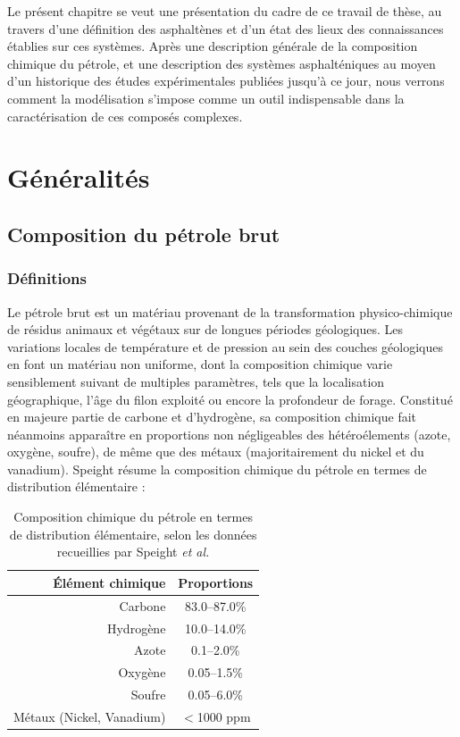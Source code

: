 Le présent chapitre se veut une présentation du cadre de ce travail de thèse, au travers d'une définition des asphaltènes et d'un état des lieux des connaissances établies sur ces systèmes. Après une description générale de la composition chimique du pétrole, et une description des systèmes asphalténiques au moyen d'un historique des études expérimentales publiées jusqu'à ce jour, nous verrons comment la modélisation s'impose comme un outil indispensable dans la caractérisation de ces composés complexes. 




\section{Généralités}

\subsection{Composition du pétrole brut}

\subsubsection{Définitions}

Le pétrole brut est un matériau provenant de la transformation physico-chimique de résidus animaux et végétaux sur de longues périodes géologiques. Les variations locales de température et de pression au sein des couches géologiques en font un matériau non uniforme, dont la composition chimique varie sensiblement suivant de multiples paramètres, tels que la localisation géographique, l'âge du filon exploité ou encore la profondeur de forage. Constitué en majeure partie de carbone et d'hydrogène, sa composition chimique fait néanmoins apparaître en proportions non négligeables des hétéroélements (azote, oxygène, soufre), de même que des métaux (majoritairement du nickel et du vanadium). Speight \cite{speight1979some} résume la composition chimique du pétrole en termes de distribution élémentaire : 

\begin{table}[h!]
	\begin{center}
		\begin{tabular}{r|c}
			\hline
			Élément chimique & Proportions \\
			\hline
			Carbone & 83.0--87.0\% \\
			Hydrogène & 10.0--14.0\% \\
			Azote & 0.1--2.0\% \\
			Oxygène & 0.05--1.5\% \\
			Soufre & 0.05--6.0\% \\
			Métaux (Nickel, Vanadium) & $<$1000 ppm \\
			\hline
		\end{tabular}
	\end{center}
	\caption{Composition chimique du pétrole en termes de distribution élémentaire, selon les données recueillies par Speight \textit{et al.}}
	\label{DESpeight}
\end{table}

